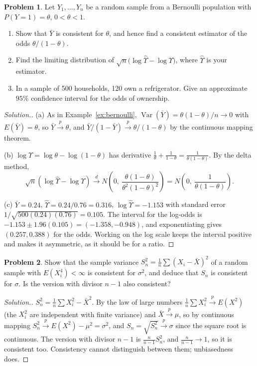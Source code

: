 \documentclass[11pt,a4paper]{article}
\numberwithin{equation}{section}
\DeclareMathOperator{\Var}{Var}
\theoremstyle{definition}
\newtheorem{problemx}{Problem}[subsection]
\newenvironment{problem}{\begin{problemx}}{\end{problemx}}
\newenvironment{solution}
  {\renewcommand{\qedsymbol}{}\begin{proof}[\textit{Solution}.]}
  {\end{proof}}
\begin{document}
\begin{problem}
Let $Y_1, \dots, Y_n$ be a random sample from a Bernoulli population with $P(Y = 1) = \theta$, $0 < \theta < 1$.
\begin{enumerate}[label=(\alph*)]
\item Show that $\bar Y$ is consistent for $\theta$, and hence find a consistent estimator of the odds $\theta/(1 - \theta)$.
\item Find the limiting distribution of $\sqrt n\bigl(\log\hat\Upsilon - \log\Upsilon\bigr)$, where $\hat\Upsilon$ is your estimator.
\item In a sample of 500 households, 120 own a refrigerator. Give an approximate $95\%$ confidence interval for the odds of ownership.
\end{enumerate}
\end{problem}

\begin{solution}
(a) As in Example~\ref{ex:bernoulli}, $\Var(\bar Y) = \theta(1 - \theta)/n \to 0$ with $E(\bar Y) = \theta$, so $\bar Y \xrightarrow{p} \theta$, and
$\bar Y/(1 - \bar Y) \xrightarrow{p} \theta/(1 - \theta)$ by the continuous mapping theorem.

(b) $\log\Upsilon = \log\theta - \log(1 - \theta)$ has derivative $\frac1\theta + \frac{1}{1 - \theta} = \frac{1}{\theta(1 - \theta)}$. By the delta method,
\[
\sqrt n(\log\hat\Upsilon - \log\Upsilon) \xrightarrow{d} N\left(0,\ \frac{\theta(1 - \theta)}{\theta^2(1 - \theta)^2}\right) = N\left(0,\ \frac{1}{\theta(1 - \theta)}\right) .
\]

(c) $\bar Y = 0.24$, $\hat\Upsilon = 0.24/0.76 = 0.316$, $\log\hat\Upsilon = -1.153$ with standard error $1/\sqrt{500(0.24)(0.76)} = 0.105$. The interval for the
log-odds is $-1.153 \pm 1.96(0.105) = (-1.358, -0.948)$, and exponentiating gives $(0.257, 0.388)$ for the odds. Working on the log scale keeps the
interval positive and makes it asymmetric, as it should be for a ratio.
\end{solution}

\begin{problem}
Show that the sample variance $S_n^2 = \frac1n\sum (X_i - \bar X)^2$ of a random sample with $E(X_i^4) < \infty$ is consistent for $\sigma^2$, and deduce that
$S_n$ is consistent for $\sigma$. Is the version with divisor $n - 1$ also consistent?
\end{problem}

\begin{solution}
$S_n^2 = \frac1n\sum X_i^2 - \bar X^2$. By the law of large numbers $\frac1n\sum X_i^2 \xrightarrow{p} E(X^2)$ (the $X_i^2$ are independent with finite variance)
and $\bar X \xrightarrow{p} \mu$, so by continuous mapping $S_n^2 \xrightarrow{p} E(X^2) - \mu^2 = \sigma^2$, and $S_n = \sqrt{S_n^2} \xrightarrow{p} \sigma$ since the square
root is continuous. The version with divisor $n - 1$ is $\frac{n}{n-1}S_n^2$, and $\frac{n}{n-1} \to 1$, so it is consistent too. Consistency cannot
distinguish between them; unbiasedness does.
\end{solution}
\end{document}
